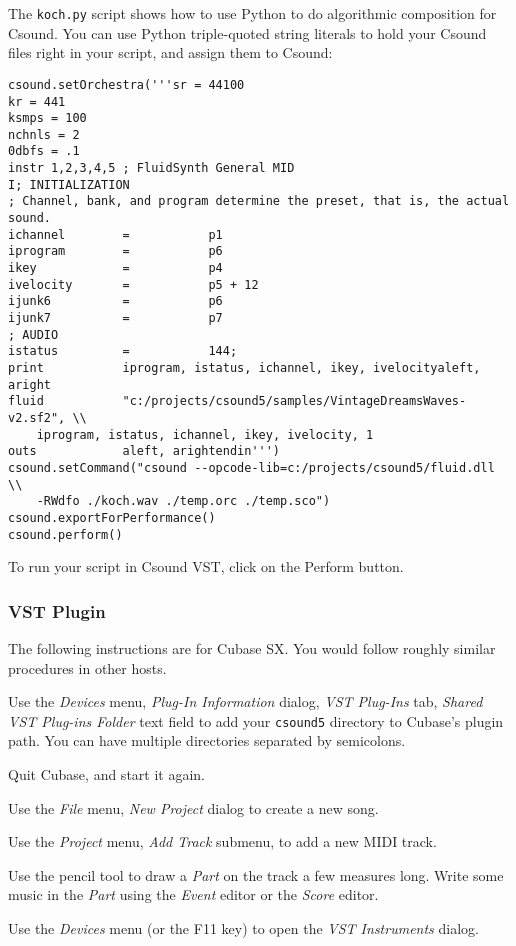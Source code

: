 \documentclass[10pt,letterpaper,onecolumn]{book}
\begin{document}
The \texttt{koch.py} script shows how to use Python to do algorithmic composition for Csound. You can use Python triple-quoted string literals to hold your Csound files right in your script, and assign them to Csound: 

\begin{lstlisting}
csound.setOrchestra('''sr = 44100
kr = 441
ksmps = 100   
nchnls = 2
0dbfs = .1
instr 1,2,3,4,5 ; FluidSynth General MID
I; INITIALIZATION
; Channel, bank, and program determine the preset, that is, the actual sound.
ichannel		=			p1
iprogram		=			p6
ikey	 		= 			p4
ivelocity 		= 			p5 + 12
ijunk6 			= 			p6
ijunk7			=			p7
; AUDIO
istatus			=			144;			
print			iprogram, istatus, ichannel, ikey, ivelocityaleft, aright		
fluid			"c:/projects/csound5/samples/VintageDreamsWaves-v2.sf2", \\
    iprogram, istatus, ichannel, ikey, ivelocity, 1			
outs 			aleft, arightendin''')
csound.setCommand("csound --opcode-lib=c:/projects/csound5/fluid.dll \\
    -RWdfo ./koch.wav ./temp.orc ./temp.sco")
csound.exportForPerformance()
csound.perform()
\end{lstlisting}

To run your script in Csound VST, click on the Perform button. 

\subsubsection{VST Plugin}
The following instructions are for Cubase SX. You would follow roughly similar procedures in other hosts.

Use the \emph{Devices} menu, \emph{Plug-In Information} dialog, \emph{VST Plug-Ins} tab, \emph{Shared VST Plug-ins Folder} text field to add your \texttt{csound5} directory to Cubase's plugin path. You can have multiple directories separated by semicolons. 

Quit Cubase, and start it again. 

Use the \emph{File} menu, \emph{New Project} dialog to create a new song. 

Use the \emph{Project} menu, \emph{Add Track} submenu, to add a new MIDI track. 

Use the pencil tool to draw a \emph{Part} on the track a few measures long. Write some music in the \emph{Part} using the \emph{Event} editor or the \emph{Score} editor. 

Use the \emph{Devices} menu (or the F11 key) to open the \emph{VST Instruments} dialog. 
\end{document}
